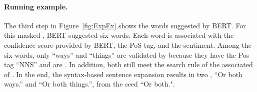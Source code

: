 \paragraph*{Running example.} The third step in Figure~\ref{fig:ExpEx} shows the words suggested
by BERT. For this masked \sent, BERT suggested six words. Each word
is associated with the confidence score provided by BERT, the PoS tag,
and the sentiment. Among the six words, only ``ways'' and ``things''
are validated by \tool{} because they have the Pos tag ``NNS'' and are
\neu. In addition, both \sents still meet the search
rule of the associated \lc of \SareqExOne. In the end,  the syntax-based sentence expansion results in two \sents, ``Or both ways.'' and ``Or both things.'', from the seed ``Or both.".




